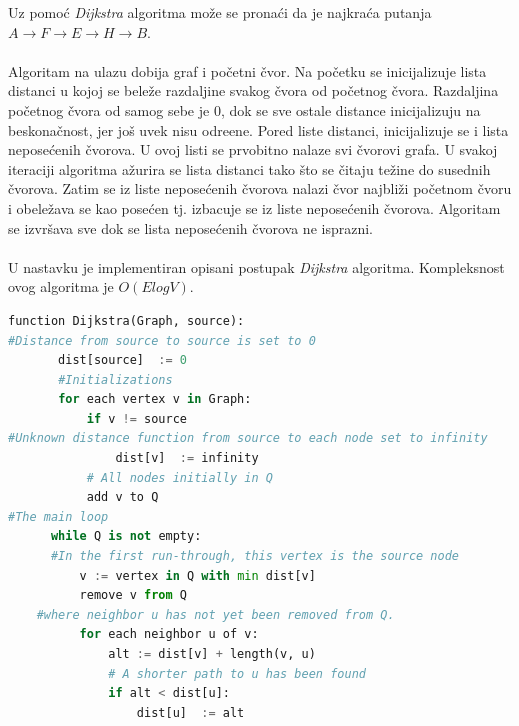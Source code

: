  Uz pomo\' c {\it\textenglish{Dijkstra}} algoritma mo\v ze se prona\' ci da je najkra\' ca putanja \\$A \longrightarrow F \longrightarrow E \longrightarrow H \longrightarrow B$.\\
\\

Algoritam na ulazu dobija graf i po\v cetni \v cvor. Na po\v cetku se inicijalizuje  lista distanci u kojoj se bele\v ze razdaljine svakog \v cvora od po\v cetnog \v cvora. Razdaljina po\v cetnog \v cvora od samog sebe je $0$, dok se sve ostale distance inicijalizuju na beskona\v cnost, jer jo\v s uvek nisu odre\dj ene. Pored liste distanci, inicijalizuje se i lista nepose\' cenih \v cvorova. U ovoj listi se prvobitno nalaze svi \v cvorovi grafa. U svakoj iteraciji algoritma a\v zurira se lista distanci tako \v sto se \v citaju te\v zine do susednih \v cvorova. Zatim se iz liste nepose\' cenih \v cvorova nalazi \v cvor najbli\v zi po\v cetnom \v cvoru i obele\v zava se kao pose\' cen tj. izbacuje se iz liste nepose\' cenih \v cvorova. Algoritam se izvr\v sava sve dok se lista nepose\' cenih \v cvorova ne isprazni.\\
\\U nastavku je implementiran opisani postupak {\it\textenglish{Dijkstra}} algoritma. Kompleksnost ovog algoritma je $O(E log V)$.

\begin{english}
\begin{lstlisting}[language=Python]
function Dijkstra(Graph, source):
#Distance from source to source is set to 0
       dist[source]  := 0
       #Initializations
       for each vertex v in Graph: 
           if v != source
#Unknown distance function from source to each node set to infinity
               dist[v]  := infinity 
           # All nodes initially in Q
           add v to Q 
#The main loop
      while Q is not empty: 
      #In the first run-through, this vertex is the source node
          v := vertex in Q with min dist[v]
          remove v from Q 
    #where neighbor u has not yet been removed from Q.
          for each neighbor u of v:
              alt := dist[v] + length(v, u)
              # A shorter path to u has been found
              if alt < dist[u]:     
                  dist[u]  := alt            

\end{lstlisting}
\end{english}

